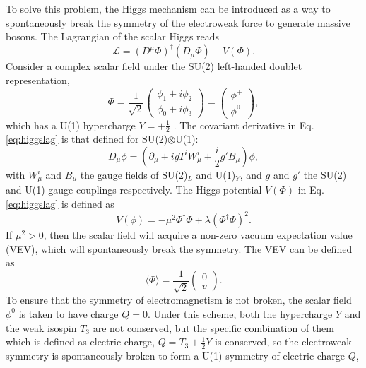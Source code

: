 \documentclass[a4paper,12pt]{article}
\begin{document}
To solve this problem, the Higgs mechanism can be introduced as a way to spontaneously break the symmetry of the electroweak force to generate massive bosons. 
The Lagrangian of the scalar Higgs reads
\begin{equation}
    \label{eq:higgslag}
    \mathcal{L} = (D^\mu\Phi)^\dagger(D_\mu\Phi) - V(\Phi).
\end{equation}
Consider a complex scalar field under the SU(2) left-handed doublet representation,
\begin{equation}
    \label{eq:doubscal}
    \Phi = \frac{1}{\sqrt{2}}\begin{pmatrix}\phi_1+i\phi_2\\\phi_0+i\phi_3\end{pmatrix} = \begin{pmatrix} \phi^+\\\phi^0\end{pmatrix},
\end{equation}
which has a U(1) hypercharge $Y=+\frac12$ \cite{dono}.
The covariant derivative in Eq.\eqref{eq:higgslag} is that defined for SU(2)$\otimes$U(1):
\begin{equation}
    \label{eq:covarhiggs}
    D_\mu\phi = \left(\partial_\mu + igT^iW_\mu^i + \frac{i}{2}g'B_\mu\right)\phi,
\end{equation}
with $W^i_\mu$ and $B_\mu$ the gauge fields of SU(2)$_L$ and U(1)$_Y$, and $g$ and $g'$ the SU(2) and U(1) gauge couplings respectively. 
The Higgs potential $V(\Phi)$ in Eq.\eqref{eq:higgslag} is defined as
\begin{equation}
    \label{eq:goldpot}
    V(\phi) = -\mu^2\Phi^\dagger\Phi + \lambda(\Phi^\dagger\Phi)^2.
\end{equation}
If $\mu^2>0$, then the scalar field will acquire a non-zero vacuum expectation value (VEV), which will spontaneously break the symmetry. 
The VEV can be defined as
\begin{equation}
    \label{eq:vev}
    \langle\Phi\rangle = \frac{1}{\sqrt{2}}\begin{pmatrix}0\\v\end{pmatrix}.
\end{equation}
To ensure that the symmetry of electromagnetism is not broken, the scalar field $\phi^0$ is taken to have charge $Q=0$.
Under this scheme, both the hypercharge $Y$ and the weak isospin $T_3$ are not conserved, but the specific combination of them which is defined as electric charge, $Q=T_3+\frac12 Y$ is conserved, so the electroweak symmetry is spontaneously broken to form a U(1) symmetry of electric charge $Q$,
\end{document}
